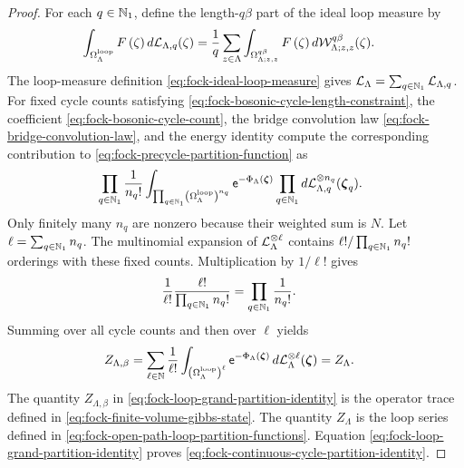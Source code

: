 \documentclass[11pt,a4paper]{article}
\theoremstyle{plain}
\theoremstyle{definition}
\theoremstyle{remark}
\begin{document}
\begin{proof}
For each $q\in\mathbb{N}_1$, define the length-$q\beta$ part of the ideal loop measure by
$$\begin{aligned}
\int_{\Omega_{\Lambda}^{\mathrm{loop}}}
F \left( \zeta \right)
\mathop{d \mathcal{L}_{\Lambda,q}}(\zeta)
& =
\frac{1}{q}
\sum_{z\in\Lambda}
\int_{\Omega_{\Lambda;z,z}^{q\beta}}
F \left( \zeta \right)
\mathop{d \mathcal{W}_{\Lambda;z,z}^{q\beta}}(\zeta).
\end{aligned}$$
The loop-measure definition \eqref{eq:fock-ideal-loop-measure} gives
$\mathcal{L}_{\Lambda}
=
\sum_{q\in\mathbb{N}_1}
\mathcal{L}_{\Lambda,q}$.
For fixed cycle counts satisfying \eqref{eq:fock-bosonic-cycle-length-constraint}, the coefficient
\eqref{eq:fock-bosonic-cycle-count}, the bridge convolution law
\eqref{eq:fock-bridge-convolution-law}, and the energy identity compute the
corresponding contribution to \eqref{eq:fock-precycle-partition-function} as
$$\begin{aligned}
&
\prod_{q\in\mathbb{N}_1}\frac{1}{n_q!}
\int_{\prod_{q\in\mathbb{N}_1}
\left( \Omega_{\Lambda}^{\mathrm{loop}} \right)^{n_q}}
\mathsf{e}^{-\Phi_{\Lambda} \left( \boldsymbol{\zeta} \right)}
\prod_{q\in\mathbb{N}_1}
\mathop{d \mathcal{L}_{\Lambda,q}^{\otimes n_q}}(\boldsymbol{\zeta}_q).
\end{aligned}$$
Only finitely many $n_q$ are nonzero because their weighted sum is $N$.
Let $\ell=\sum_{q\in\mathbb{N}_1}n_q$.
The multinomial expansion of
$\mathcal{L}_{\Lambda}^{\otimes\ell}$ contains
$\ell!/\prod_{q\in\mathbb{N}_1}n_q!$ orderings with these fixed counts.
Multiplication by $1/\ell!$ gives
$$\begin{aligned}
\frac{1}{\ell!}
\frac{\ell!}{\prod_{q\in\mathbb{N}_1}n_q!}
& =
\prod_{q\in\mathbb{N}_1}\frac{1}{n_q!}.
\end{aligned}$$
Summing over all cycle counts and then over $\ell$ yields
\begin{equation}
\begin{aligned}
Z_{\Lambda,\beta}
& =
\sum_{\ell\in\mathbb{N}}\frac{1}{\ell!}
\int_{\left( \Omega_{\Lambda}^{\mathrm{loop}} \right)^{\ell}}
\mathsf{e}^{-\Phi_{\Lambda} \left( \boldsymbol{\zeta} \right)}
\mathop{d \mathcal{L}_{\Lambda}^{\otimes\ell}}(\boldsymbol{\zeta})
=
Z_{\Lambda}.
\end{aligned}
\label{eq:fock-loop-grand-partition-identity}
\end{equation}
The quantity $Z_{\Lambda,\beta}$ in \eqref{eq:fock-loop-grand-partition-identity} is the operator trace defined
in \eqref{eq:fock-finite-volume-gibbs-state}.
The quantity $Z_{\Lambda}$ is the loop series defined in
\eqref{eq:fock-open-path-loop-partition-functions}.
Equation \eqref{eq:fock-loop-grand-partition-identity} proves
\eqref{eq:fock-continuous-cycle-partition-identity}.


\end{proof}
\end{document}

